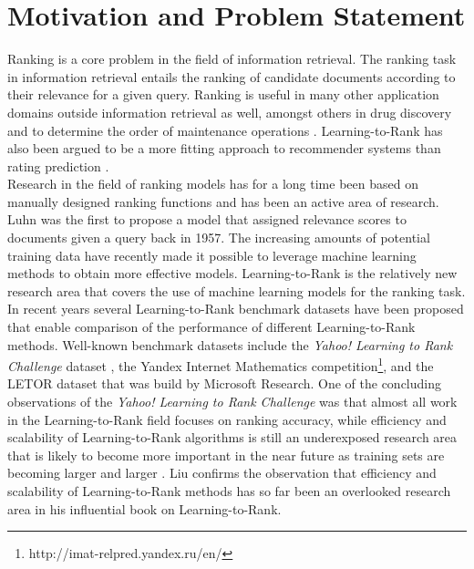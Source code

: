 \chapter{Motivation and Problem Statement}
Ranking is a core problem in the field of information retrieval. The ranking task in information retrieval entails the ranking of candidate documents according to their relevance for a given query. Ranking is useful in many other application domains outside information retrieval as well, amongst others in drug discovery and to determine the order of maintenance operations \cite{Rudin2009}. Learning-to-Rank has also been argued to be a more fitting approach to recommender systems than rating prediction \cite{Adomavicius2005,McNee2006}.\\

Research in the field of ranking models has for a long time been based on manually designed ranking functions and has been an active area of research. Luhn \cite{Luhn1957} was the first to propose a model that assigned relevance scores to documents given a query back in 1957. The increasing amounts of potential training data have recently made it possible to leverage machine learning methods to obtain more effective models. Learning-to-Rank is the relatively new research area that covers the use of machine learning models for the ranking task.\\

In recent years several Learning-to-Rank benchmark datasets have been proposed that enable comparison of the performance of different Learning-to-Rank methods. Well-known benchmark datasets include the \emph{Yahoo! Learning to Rank Challenge} dataset \cite{Chapelle2011a}, the Yandex Internet Mathematics competition\footnote{http://imat-relpred.yandex.ru/en/}, and the LETOR dataset \cite{Qin2010} that was build by Microsoft Research. One of the concluding observations of the \emph{Yahoo! Learning to Rank Challenge} was that almost all work in the Learning-to-Rank field focuses on ranking accuracy, while efficiency and scalability of Learning-to-Rank algorithms is still an underexposed research area that is likely to become more important in the near future as training sets are becoming larger and larger \cite{Chapelle2011b}. Liu \cite{Liu2007} confirms the observation that efficiency and scalability of Learning-to-Rank methods has so far been an overlooked research area in his influential book on Learning-to-Rank.\\

